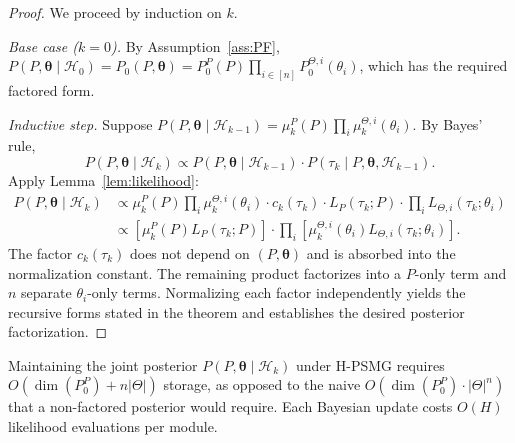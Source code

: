 \begin{proof}
We proceed by induction on $k$.

\textit{Base case ($k=0$).} By Assumption~\ref{ass:PF}, $P(P, \boldsymbol{\theta} \mid \mathcal{H}_0) = P_0(P, \boldsymbol{\theta}) = P_0^P(P) \prod_{i \in [n]} P_0^{\Theta,i}(\theta_i)$, which has the required factored form.

\textit{Inductive step.} Suppose $P(P, \boldsymbol{\theta} \mid \mathcal{H}_{k-1}) = \mu_k^P(P) \prod_{i} \mu_k^{\Theta,i}(\theta_i)$. By Bayes' rule,
\begin{equation}
P(P, \boldsymbol{\theta} \mid \mathcal{H}_k) \propto P(P, \boldsymbol{\theta} \mid \mathcal{H}_{k-1}) \cdot P(\tau_k \mid P, \boldsymbol{\theta}, \mathcal{H}_{k-1}).
\end{equation}
Apply Lemma~\ref{lem:likelihood}:
\begin{align}
P(P, \boldsymbol{\theta} \mid \mathcal{H}_k) &\propto \mu_k^P(P) \prod_{i} \mu_k^{\Theta,i}(\theta_i) \cdot c_k(\tau_k) \cdot L_P(\tau_k; P) \cdot \prod_{i} L_{\Theta,i}(\tau_k; \theta_i) \\
&\propto \left[\mu_k^P(P) L_P(\tau_k; P)\right] \cdot \prod_{i} \left[\mu_k^{\Theta,i}(\theta_i) L_{\Theta,i}(\tau_k; \theta_i)\right].
\end{align}
The factor $c_k(\tau_k)$ does not depend on $(P, \boldsymbol{\theta})$ and is absorbed into the normalization constant. The remaining product factorizes into a $P$-only term and $n$ separate $\theta_i$-only terms. Normalizing each factor independently yields the recursive forms stated in the theorem and establishes the desired posterior factorization.
\end{proof}

\begin{corollary}
\label{cor:storage}
Maintaining the joint posterior $P(P, \boldsymbol{\theta} \mid \mathcal{H}_k)$ under H-PSMG requires $O\left(\dim(P_0^P) + n |\Theta|\right)$ storage, as opposed to the naive $O\left(\dim(P_0^P) \cdot |\Theta|^n\right)$ that a non-factored posterior would require. Each Bayesian update costs $O(H)$ likelihood evaluations per module.
\end{corollary}

